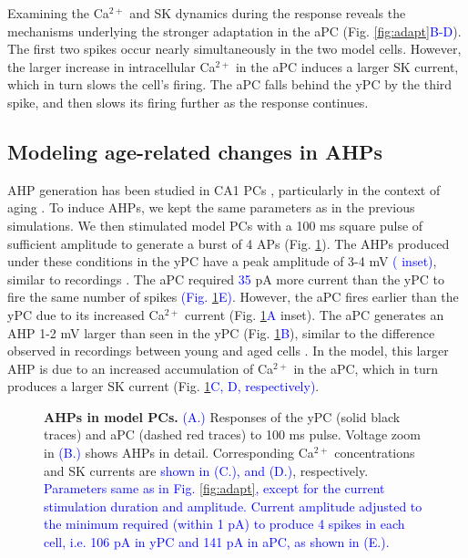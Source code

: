 \documentclass[10pt,letterpaper]{article}
\newcommand{\Ca}{Ca$^{2+}$}
\newcommand{\edit}[1]{\textcolor{blue}{#1}}
\begin{document}
Examining the {\Ca} and SK dynamics during the response reveals the mechanisms underlying the stronger adaptation in the aPC (Fig. \ref{fig:adapt}\edit{B-D}). The first two spikes occur nearly simultaneously in the two model cells. However, the larger increase in intracellular {\Ca} in the aPC induces a larger SK current, which in turn slows the cell's firing. The aPC falls behind the yPC by the third spike, and then slows its firing further as the response continues.

\subsection*{Modeling age-related changes in AHPs}

AHP generation has been studied in CA1 PCs \cite{storm1989after}, particularly in the context of aging  \cite{disterhoft1996calcium,gant2006early,matthews2009fast,moyer1992nimodipine}. To induce AHPs, we kept the same parameters as in the previous simulations. We then stimulated model PCs with a 100 ms square pulse of sufficient amplitude to generate a burst of 4 APs (Fig. \ref{fig:AHP}). The AHPs produced under these conditions in the yPC have a peak amplitude of 3-4 mV \edit{( inset)}, similar to recordings \cite{matthews2009fast,power2002age}. The aPC required \edit{35} pA more current than the yPC to fire the same number of spikes \edit{(Fig. \ref{fig:AHP}E)}. However, the aPC fires earlier than the yPC due to its increased {\Ca} current (Fig. \ref{fig:AHP}\edit{A} inset). The aPC generates an AHP 1-2 mV larger than seen in the yPC (Fig. \ref{fig:AHP}\edit{B}), similar to the difference observed in recordings between young and aged cells \cite{moyer1992nimodipine,gant2006early,power2002age}. In the model, this larger AHP is due to an increased accumulation of {\Ca} in the aPC, which in turn produces a larger SK current (Fig. \ref{fig:AHP}\edit{C, D, respectively)}.

\begin{figure}[h!]
\centering
\caption{{\bf AHPs in model PCs.}
\edit{(A.)} Responses of the yPC (solid black traces) and aPC (dashed red traces) to 100 ms pulse. Voltage zoom in \edit{(B.)} shows AHPs in detail. Corresponding {\Ca} concentrations and SK currents are \edit{shown in (C.), and (D.)}, respectively. \edit{Parameters same as in Fig. \ref{fig:adapt}, except for the current stimulation duration and amplitude. Current amplitude adjusted to the minimum required (within 1 pA) to produce 4
spikes in each cell, i.e. 106 pA in yPC and 141 pA in aPC, as shown in (E.).}}
\label{fig:AHP}
\end{figure}
\end{document}
